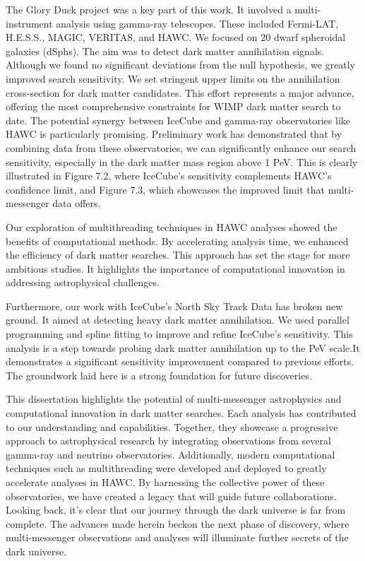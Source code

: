 The Glory Duck project was a key part of this work.
It involved a multi-instrument analysis using gamma-ray telescopes. These included Fermi-LAT, H.E.S.S., MAGIC, VERITAS, and HAWC.
We focused on 20 dwarf spheroidal galaxies (dSphs).
The aim was to detect dark matter annihilation signals.
Although we found no significant deviations from the null hypothesis, we greatly improved search sensitivity.
We set stringent upper limits on the annihilation cross-section for dark matter candidates.
This effort represents a major advance, offering the most comprehensive constraints for WIMP dark matter search to date.
The potential synergy between IceCube and gamma-ray observatories like HAWC is particularly promising.
Preliminary work has demonstrated that by combining data from these observatories, we can significantly enhance our search sensitivity, especially in the dark matter mass region above 1 PeV.
This is clearly illustrated in Figure 7.2, where IceCube's sensitivity complements HAWC's confidence limit, and Figure 7.3, which showcases the improved limit that multi-messenger data offers.

Our exploration of multithreading techniques in HAWC analyses showed the benefits of computational methods.
By accelerating analysis time, we enhanced the efficiency of dark matter searches. This approach has set the stage for more ambitious studies.
It highlights the importance of computational innovation in addressing astrophysical challenges.

Furthermore, our work with IceCube's North Sky Track Data has broken new ground.
It aimed at detecting heavy dark matter annihilation.
We used parallel programming and spline fitting to improve and refine IceCube's  sensitivity.
This analysis is a step towards probing dark matter annihilation up to the PeV scale.It demonstrates a significant sensitivity improvement compared to previous efforts. The groundwork laid here is a strong foundation for future discoveries.

This dissertation highlights the potential of multi-messenger astrophysics and computational innovation in dark matter searches.
Each analysis has contributed to our understanding and capabilities.
Together, they showcase a progressive approach to astrophysical research by integrating observations from several gamma-ray and neutrino observatories.
Additionally, modern computational techniques such as multithreading were developed and deployed to greatly accelerate analyses in HAWC.
By harnessing the collective power of these observatories, we have created a legacy that will guide future collaborations.
Looking back, it's clear that our journey through the dark universe is far from complete.
The advances made herein beckon the next phase of discovery, where multi-messenger observations and analyses will illuminate further secrets of the dark universe.